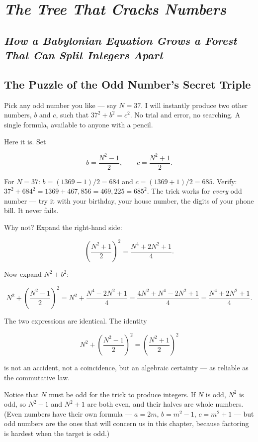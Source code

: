 \chapter{\textit{The Tree That Cracks Numbers}}
\label{ch14}

\section{\textit{How a Babylonian Equation Grows a Forest That Can Split Integers Apart}}


\bigskip


\section{The Puzzle of the Odd Number's Secret Triple}

Pick any odd number you like --- say $N = 37$. I will instantly produce two other numbers, $b$ and $c$, such that $37^2 + b^2 = c^2$. No trial and error, no searching. A single formula, available to anyone with a pencil.

Here it is. Set

\[
b = \frac{N^2 - 1}{2}, \qquad c = \frac{N^2 + 1}{2}.
\]

For $N = 37$: $b = (1369 - 1)/2 = 684$ and $c = (1369 + 1)/2 = 685$. Verify: $37^2 + 684^2 = 1369 + 467{,}856 = 469{,}225 = 685^2$. The trick works for \textit{every} odd number --- try it with your birthday, your house number, the digits of your phone bill. It never fails.

Why not? Expand the right-hand side:

\[
\left(\frac{N^2 + 1}{2}\right)^{\!2} = \frac{N^4 + 2N^2 + 1}{4}.
\]

Now expand $N^2 + b^2$:

\[
N^2 + \left(\frac{N^2 - 1}{2}\right)^{\!2} = N^2 + \frac{N^4 - 2N^2 + 1}{4} = \frac{4N^2 + N^4 - 2N^2 + 1}{4} = \frac{N^4 + 2N^2 + 1}{4}.
\]

The two expressions are identical. The identity

\[
N^2 + \left(\frac{N^2 - 1}{2}\right)^{\!2} = \left(\frac{N^2 + 1}{2}\right)^{\!2}
\]

is not an accident, not a coincidence, but an algebraic certainty --- as reliable as the commutative law.

Notice that $N$ must be odd for the trick to produce integers. If $N$ is odd, $N^2$ is odd, so $N^2 - 1$ and $N^2 + 1$ are both even, and their halves are whole numbers. (Even numbers have their own formula --- $a = 2m$, $b = m^2 - 1$, $c = m^2 + 1$ --- but odd numbers are the ones that will concern us in this chapter, because factoring is hardest when the target is odd.)


